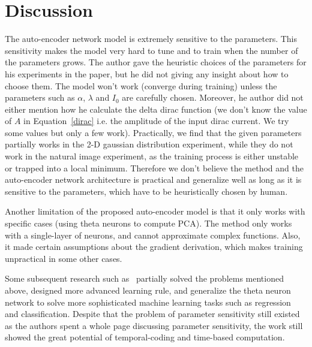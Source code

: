 \section{Discussion}
\label{discussion}

The auto-encoder network model is extremely sensitive to the parameters.
This sensitivity makes the model very hard to tune and to train when the number of the parameters grows.
The author gave the heuristic choices of the parameters for his experiments in the paper, 
but he did not giving any insight about how to choose them. 
The model won't work (converge during training) unless the parameters such as 
$\alpha$, $\lambda$ and $I_0$ are carefully chosen.
Moreover, he author did not either mention how he calculate the delta dirac function 
(we don't know the value of $A$ in Equation~\ref{dirac} i.e. the amplitude of the input
dirac current. We try some values but only a few work).
Practically, we find that the given parameters partially works in the 2-D gaussian distribution experiment, 
while they do not work in the natural image experiment,
as the training process is either unstable or trapped into a local minimum. 
Therefore we don't believe the method and the auto-encoder network architecture is practical and generalize well
as long as it is sensitive to the parameters, which have to be heuristically chosen by human.

Another limitation of the proposed auto-encoder model is that it only works with specific cases
(using theta neurons to compute PCA).
The method only works with a single-layer of neurons, and cannot approximate complex functions.
Also, it made certain assumptions about the gradient derivation, which makes training unpractical in some other cases.

Some subsequent research such as~\cite{mckennoch2009spike} partially solved the problems mentioned above,
designed more advanced learning rule, 
and generalize the theta neuron network to solve more sophisticated machine learning tasks such as regression and classification.
Despite that the problem of parameter sensitivity still existed as the authors spent a whole page 
discussing parameter sensitivity, the work still showed the great potential of temporal-coding and time-based computation.
